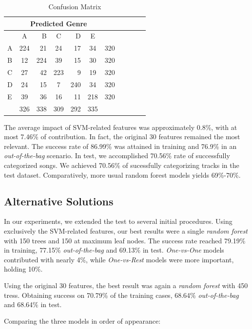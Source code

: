 \documentclass[10pt,twocolumn,letterpaper]{article}
\begin{document}
\begin{table}[H]
\begin{center}
\caption{Confusion Matrix}
\begin{tabular}{|l|*5{c|r|}}
\hline
 & \multicolumn{5}{c|}{Predicted Genre} & \\ \hline
 & A  & B  & C  & D  & E  &     \\ \hline
A& 224& 21 & 24 & 17 & 34 & 320 \\ \hline
B& 12 & 224& 39 & 15 & 30 & 320 \\ \hline
C& 27 & 42 & 223&  9 & 19 & 320 \\ \hline
D& 24 & 15 & 7  &240 & 34 & 320 \\ \hline
E& 39 & 36 & 16 & 11 & 218& 320 \\ \hline
 & 326 &338 & 309 & 292 & 335 & \\ \hline
\end{tabular}
\end{center}
\end{table}

The average impact of SVM-related features was approximately 0.8\%, with at most
7.46\% of contribution. In fact, the original 30 features remained the most
relevant. The success rate of 86.99\% was attained in
training and 76.9\% in an \emph{out-of-the-bag} scenario. In test, we
accomplished 70.56\% rate of successfully categorized songs. We
achieved 70.56\% of sucessfully categorizing tracks in the test dataset.
Comparatively, more usual random forest models yields 69\%-70\%.

\subsection{Alternative Solutions}

In our experiments, we extended the test to several initial procedures. Using
exclusively the SVM-related features, our best results were a single
\emph{random forest} \cite{Breiman} with 150 trees and 150 at maximum leaf nodes. The
success rate reached 79.19\% in training, 77.15\% \emph{out-of-the-bag} and
69.13\% in test. \emph{One-vs-One} models contributed with nearly 4\%, while
\emph{One-vs-Rest} models were more important, holding 10\%. 

Using the original 30 features, the best result was again a \emph{random forest}
with 450 tress. Obtaining success on 70.79\% of the training cases, 68.64\%
\emph{out-of-the-bag} and 68.64\% in test.

Comparing the three models in order of appearance: \\
\end{document}
